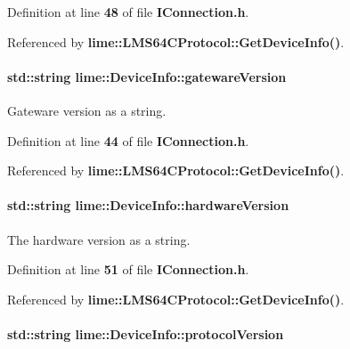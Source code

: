 Definition at line {\bf 48} of file {\bf I\+Connection.\+h}.



Referenced by {\bf lime\+::\+L\+M\+S64\+C\+Protocol\+::\+Get\+Device\+Info()}.

\paragraph[{gateware\+Version}]{\setlength{\rightskip}{0pt plus 5cm}std\+::string lime\+::\+Device\+Info\+::gateware\+Version}\label{structlime_1_1DeviceInfo_a5872a55a16808b51bfb4133a26953025}


Gateware version as a string. 



Definition at line {\bf 44} of file {\bf I\+Connection.\+h}.



Referenced by {\bf lime\+::\+L\+M\+S64\+C\+Protocol\+::\+Get\+Device\+Info()}.

\paragraph[{hardware\+Version}]{\setlength{\rightskip}{0pt plus 5cm}std\+::string lime\+::\+Device\+Info\+::hardware\+Version}\label{structlime_1_1DeviceInfo_aea635b385cd60d6de7b6573f9794b73c}


The hardware version as a string. 



Definition at line {\bf 51} of file {\bf I\+Connection.\+h}.



Referenced by {\bf lime\+::\+L\+M\+S64\+C\+Protocol\+::\+Get\+Device\+Info()}.

\paragraph[{protocol\+Version}]{\setlength{\rightskip}{0pt plus 5cm}std\+::string lime\+::\+Device\+Info\+::protocol\+Version}\label{structlime_1_1DeviceInfo_ad79fb7f91484ec737bd68e1046a523cb}



